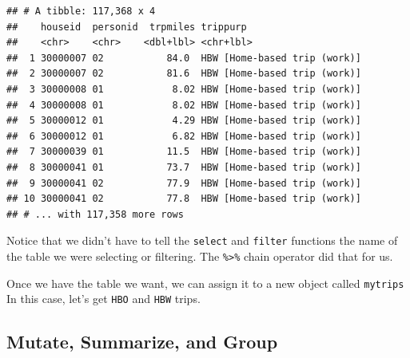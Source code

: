 \documentclass[]{book}
\newenvironment{Shaded}{\begin{snugshade}}{\end{snugshade}}
\newcommand{\CommentTok}[1]{\textcolor[rgb]{0.56,0.35,0.01}{\textit{#1}}}
\newcommand{\KeywordTok}[1]{\textcolor[rgb]{0.13,0.29,0.53}{\textbf{#1}}}
\newcommand{\NormalTok}[1]{#1}
\newcommand{\OperatorTok}[1]{\textcolor[rgb]{0.81,0.36,0.00}{\textbf{#1}}}
\newcommand{\StringTok}[1]{\textcolor[rgb]{0.31,0.60,0.02}{#1}}
\begin{document}
\begin{Shaded}
\end{Shaded}

\begin{verbatim}
## # A tibble: 117,368 x 4
##    houseid  personid  trpmiles trippurp                    
##    <chr>    <chr>    <dbl+lbl> <chr+lbl>                   
##  1 30000007 02           84.0  HBW [Home-based trip (work)]
##  2 30000007 02           81.6  HBW [Home-based trip (work)]
##  3 30000008 01            8.02 HBW [Home-based trip (work)]
##  4 30000008 01            8.02 HBW [Home-based trip (work)]
##  5 30000012 01            4.29 HBW [Home-based trip (work)]
##  6 30000012 01            6.82 HBW [Home-based trip (work)]
##  7 30000039 01           11.5  HBW [Home-based trip (work)]
##  8 30000041 01           73.7  HBW [Home-based trip (work)]
##  9 30000041 02           77.9  HBW [Home-based trip (work)]
## 10 30000041 02           77.8  HBW [Home-based trip (work)]
## # ... with 117,358 more rows
\end{verbatim}

Notice that we didn't have to tell the \texttt{select} and \texttt{filter} functions the
name of the table we were selecting or filtering. The \texttt{\%\textgreater{}\%} chain operator did
that for us.

Once we have the table we want, we can assign it to a new object called \texttt{mytrips}
In this case, let's get \texttt{HBO} and \texttt{HBW} trips.

\begin{Shaded}
\end{Shaded}

\hypertarget{app-mutate}{%
\subsection{Mutate, Summarize, and Group}\label{app-mutate}}
\end{document}
